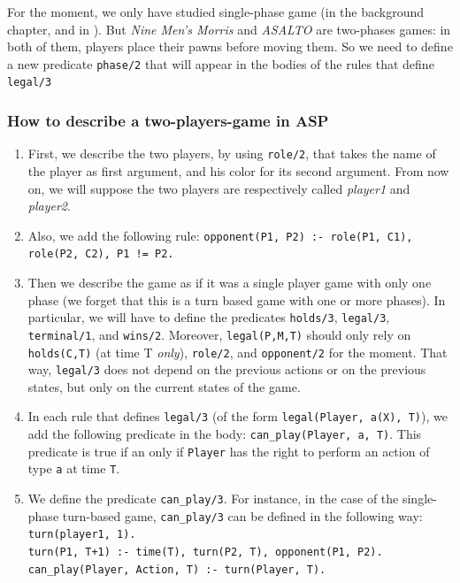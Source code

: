 \bigskip

For the moment, we only have studied single-phase game (in the background chapter, and in \cite{thielscher2009answer}). But \textit{Nine Men's Morris} and \textit{ASALTO} are two-phases games: in both of them, players place their pawns before moving them. So we need to define a new predicate \texttt{phase/2} that will appear in the bodies of the rules that define \texttt{legal/3}

\subsubsection{How to describe a two-players-game in ASP}

\begin{enumerate}

\item First, we describe the two players, by using \texttt{role/2}, that takes the name of the player as first argument, and his color for its second argument. From now on, we will suppose the two players are respectively called \textit{player1} and \textit{player2}.  

\item Also, we add the following rule: \newline
\texttt{opponent(P1, P2) :- role(P1, C1), role(P2, C2), P1 != P2.}

\item Then we describe the game as if it was a single player game with only one phase \citep{thielscher2009answer} (we forget that this is a turn based game with one or more phases). In particular, we will have to define the predicates \texttt{holds/3}, \texttt{legal/3}, \texttt{terminal/1}, and \texttt{wins/2}. Moreover,  \texttt{legal(P,M,T)} should only rely on \texttt{holds(C,T)} (at time T \textit{only}), \texttt{role/2}, and \texttt{opponent/2} for the moment. That way, \texttt{legal/3} does not depend on the previous actions or on the previous states, but only on the current states of the game.

\item In each rule that defines \texttt{legal/3} (of the form \texttt{legal(Player, a(X), T)}), we add the following predicate in the body: \texttt{can\_play(Player, a, T)}. This predicate is true if an only if \texttt{Player} has the right to perform an action of type \texttt{a} at time \texttt{T}. 

\item We define the predicate \texttt{can\_play/3}. For instance, in the case of the single-phase turn-based game, \texttt{can\_play/3} can be defined in the following way:\newline
\texttt{turn(player1, 1). }\\
\texttt{turn(P1, T+1) :- time(T), turn(P2, T), opponent(P1, P2).}\\
\texttt{can\_play(Player, Action, T) :- turn(Player, T).}



\end{enumerate}
